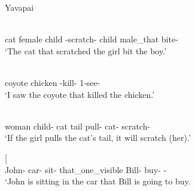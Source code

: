 \enlargethispage{2\baselineskip}
\begin{exe}\ex\label{YavDep} {Yavapai}  \citep[Yuman; Arizona; ][51, 213, 24, 221]{Kendall:1976}\nopagebreak[4] 
\begin{xlist}
\ex\gll  {\rm[}   \textipa{k-ttmo:-c}{\rm]}   \\
cat female child \relativ{}-scratch-\nom{} child male\_that bite-\compl{}\\
`The cat that scratched the girl bit the boy.'%

\ex\gll  {\rm[}  \textipa{k-ne:h-a}{\rm]} \\
coyote chicken \relativ{}-kill-\tns{} 1-see-\compl{}\\
`I saw the coyote that killed the chicken.' %

\ex\gll  {\rm[}    \textipa{syo:m-kiTo}{\rm]}  \\
woman child-\nom{} cat tail pull-\cond{} cat-\nom{} scratch-\fut{}\\
`If the girl pulls the cat's tail, it will scratch (her).'


\ex\gll{}   {\rm[}   \textipa{no:-km}{\rm]}\\
John-\nom{} car-\ines{} sit-\allo{} that\_one\_visible Bill-\nom{} buy-\ego{} \fut{}-\icml{}\\
`John is sitting in the car that Bill is going to buy.

\end{xlist}
\end{exe}

